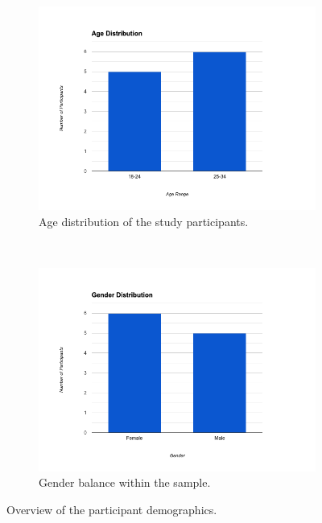 \documentclass{l4proj}
\begin{document}
\begin{figure}[h]
  \centering

  \begin{subfigure}[t]{0.45\textwidth}
    \includegraphics[width=\textwidth]{dissertation/images/age_representation.png} 
    \caption{Age distribution of the study participants.}
    \label{fig:age_representation} 
  \end{subfigure}
  ~ 
  \begin{subfigure}[t]{0.45\textwidth}
    \includegraphics[width=\textwidth]{dissertation/images/gender_representation.png}
    \caption{Gender balance within the sample.}
    \label{fig:gender_representation} 
  \end{subfigure}  

  \caption{Overview of the participant demographics.}  
  \label{fig:participant_demographics} 
\end{figure}
\end{document}
